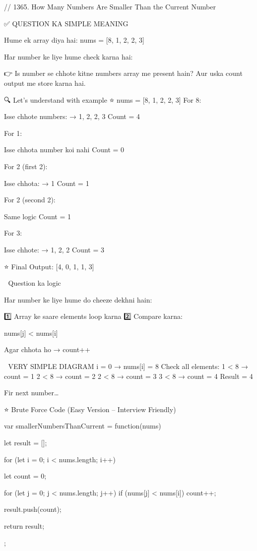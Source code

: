 
// 1365. How Many Numbers Are Smaller Than the Current Number

✅ QUESTION KA SIMPLE MEANING

Hume ek array diya hai:
nums = [8, 1, 2, 2, 3]

Har number ke liye hume check karna hai:

👉 Is number se chhote kitne numbers array me present hain?
Aur uska count output me store karna hai.

🔍 Let’s understand with example
⭐ nums = [8, 1, 2, 2, 3]
For 8:

Isse chhote numbers:
→ 1, 2, 2, 3
Count = 4

For 1:

Isse chhota number koi nahi
Count = 0

For 2 (first 2):

Isse chhota:
→ 1
Count = 1

For 2 (second 2):

Same logic
Count = 1

For 3:

Isse chhote:
→ 1, 2, 2
Count = 3

⭐ Final Output:
[4, 0, 1, 1, 3]

🧠 Question ka logic

Har number ke liye hume do cheeze dekhni hain:

1️⃣ Array ke saare elements loop karna
2️⃣ Compare karna:

nums[j] < nums[i]


Agar chhota ho → count++

📌 VERY SIMPLE DIAGRAM
i = 0 → nums[i] = 8
Check all elements:
1 < 8  → count = 1
2 < 8  → count = 2
2 < 8  → count = 3
3 < 8  → count = 4
Result = 4


Fir next number…

⭐ Brute Force Code (Easy Version – Interview Friendly)



var smallerNumbersThanCurrent = function(nums) {
    let result = [];

    for (let i = 0; i < nums.length; i++) {
        let count = 0;

        for (let j = 0; j < nums.length; j++) {
            if (nums[j] < nums[i]) {
                count++;
            }
        }

        result.push(count);
    }
    
    return result;
};
